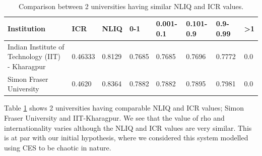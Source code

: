 \documentclass{article}
\begin{document}




\\
  
\begin{table}[h]
    \centering
\begin{tabular}{ | m{15em} | m{1cm}| m{1cm} |m{1cm}| m{1cm}|m{1cm}| m{1cm}| m{1cm}|} 
\hline
Institution & ICR & NLIQ & 0-1 & 0.001-0.1 & 0.101-0.9 & 0.9-0.99 & >1\\ 
\hline
Indian Institute of Technology (IIT) - Kharagpur & 0.46333 &	0.8129 & 0.7685	& 0.7685 &	0.7696 &	0.7772 & 0.0 \\ 
\hline
Simon Fraser University & 0.4620 &	0.8364 & 0.7882 &	0.7882 &	0.7895 & 0.7981	& 0.0\\
\hline
\end{tabular}
    \caption{Comparison between 2 universities having similar NLIQ and ICR values.}
    \label{tab:comptab}
\end{table}

Table \ref{tab:comptab} shows 2 universities having comparable NLIQ and ICR values; Simon Fraser University and IIT-Kharagpur. We see that the value of rho and internationality varies although the NLIQ and ICR values are very similar. This is at par with our initial hypothesis, where we considered this system modelled using CES to be chaotic in nature.  


\newpage
\end{document}

